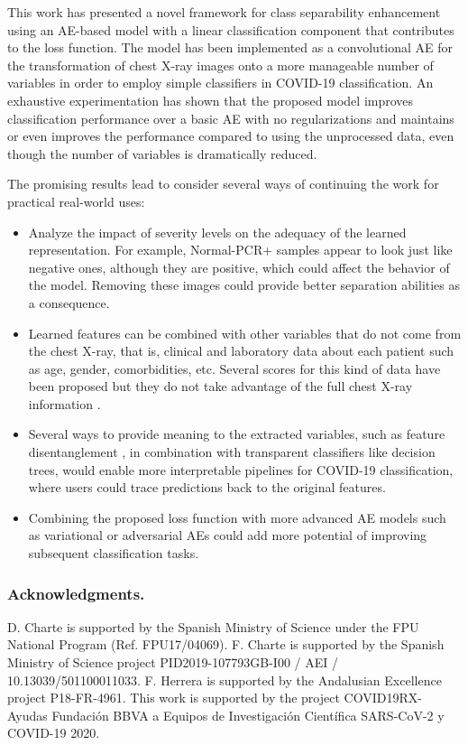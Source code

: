 \documentclass[
	fontsize=11pt, %
	twoside=false, %
	open=any, %
	secnumdepth=1, %
]{kaobook}
\begin{document}
This work has presented a novel framework for class separability enhancement using an AE-based model with a linear classification component that contributes to the loss function. The model has been implemented as a convolutional AE for the transformation of chest X-ray images onto a more manageable number of variables in order to employ simple classifiers in COVID-19 classification. An exhaustive experimentation has shown that the proposed model improves classification performance over a basic AE with no regularizations and maintains or even improves the performance compared to using the unprocessed data, even though the number of variables is dramatically reduced.

The promising results lead to consider several ways of continuing the work for practical real-world uses:
\begin{itemize}
    \item Analyze the impact of severity levels on the adequacy of the learned representation. For example, Normal-PCR+ samples appear to look just like negative ones, although they are positive, which could affect the behavior of the model. Removing these images could provide better separation abilities as a consequence.
    \item Learned features can be combined with other variables that do not come from the chest X-ray, that is, clinical and laboratory data about each patient such as age, gender, comorbidities, etc. Several scores for this kind of data have been proposed but they do not take advantage of the full chest X-ray information \cite{gong2020tool,knight2020risk}.
    \item Several ways to provide meaning to the extracted variables, such as feature disentanglement \cite{yu2019multi}, in combination with transparent classifiers like decision trees, would enable more interpretable pipelines for COVID-19 classification, where users could trace predictions back to the original features.
    \item Combining the proposed loss function with more advanced AE models such as variational or adversarial AEs could add more potential of improving subsequent classification tasks.
\end{itemize}

\subsubsection{Acknowledgments.} D. Charte is supported by the Spanish Ministry of Science under the FPU National Program (Ref. FPU17/04069). F. Charte is supported by the Spanish Ministry of Science project PID2019-107793GB-I00 / AEI / 10.13039/501100011033. F. Herrera is supported by the Andalusian Excellence project P18-FR-4961. This work is supported by the project COVID19RX-Ayudas Fundaci{\'o}n BBVA a Equipos de Investigaci{\'o}n Cient{\'i}fica SARS-CoV-2 y COVID-19 2020.
\end{document}
